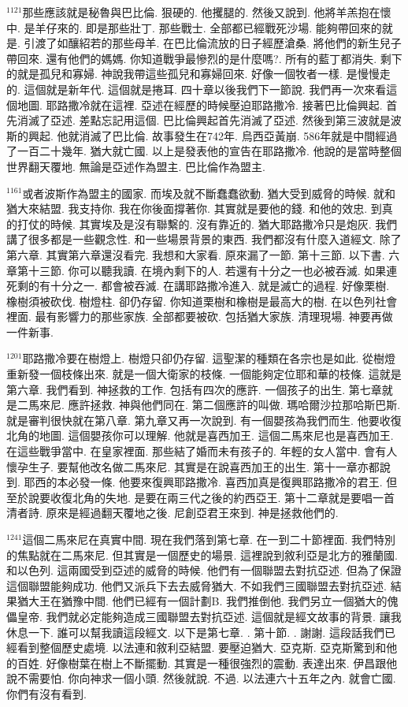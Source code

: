 \documentclass{book}
\begin{document}
$^{1121}$那些應該就是秘魯與巴比倫.
狠硬的.
他攫腿的.
然後又說到.
他將羊羔抱在懷中.
是羊仔來的.
即是那些壯丁.
那些戰士.
全部都已經戰死沙場.
能夠帶回來的就是.
引渡了如釀紹若的那些母羊.
在巴比倫流放的日子經歷滄桑.
將他們的新生兒子帶回來.
還有他們的媽媽.
你知道戰爭最慘烈的是什麼嗎?.
所有的藍丁都消失.
剩下的就是孤兒和寡婦.
神說我帶這些孤兒和寡婦回來.
好像一個牧者一樣.
是慢慢走的.
這個就是新年代.
這個就是捲耳.
四十章以後我們下一節說.
我們再一次來看這個地圖.
耶路撒冷就在這裡.
亞述在經歷的時候壓迫耶路撒冷.
接著巴比倫興起.
首先消滅了亞述.
差點忘記用這個.
巴比倫興起首先消滅了亞述.
然後到第三波就是波斯的興起.
他就消滅了巴比倫.
故事發生在742年.
烏西亞黃崩.
586年就是中間經過了一百二十幾年.
猶大就亡國.
以上是發表他的宣告在耶路撒冷.
他說的是當時整個世界翻天覆地.
無論是亞述作為盟主.
巴比倫作為盟主.

$^{1161}$或者波斯作為盟主的國家.
而埃及就不斷蠢蠢欲動.
猶大受到威脅的時候.
就和猶大來結盟.
我支持你.
我在你後面撐著你.
其實就是要他的錢.
和他的效忠.
到真的打仗的時候.
其實埃及是沒有聯繫的.
沒有靠近的.
猶大耶路撒冷只是炮灰.
我們講了很多都是一些觀念性.
和一些場景背景的東西.
我們都沒有什麼入道經文.
除了第六章.
其實第六章還沒看完.
我想和大家看.
原來漏了一節.
第十三節.
以下書.
六章第十三節.
你可以聽我讀.
在境內剩下的人.
若還有十分之一也必被吞滅.
如果連死剩的有十分之一.
都會被吞滅.
在講耶路撒冷進入.
就是滅亡的過程.
好像栗樹.
橡樹須被砍伐.
樹燈柱.
卻仍存留.
你知道栗樹和橡樹是最高大的樹.
在以色列社會裡面.
最有影響力的那些家族.
全部都要被砍.
包括猶大家族.
清理現場.
神要再做一件新事.

$^{1201}$耶路撒冷要在樹燈上.
樹燈只卻仍存留.
這聖潔的種類在各宗也是如此.
從樹燈重新發一個枝條出來.
就是一個大衛家的枝條.
一個能夠定位耶和華的枝條.
這就是第六章.
我們看到.
神拯救的工作.
包括有四次的應許.
一個孩子的出生.
第七章就是二馬來尼.
應許拯救.
神與他們同在.
第二個應許的叫做.
瑪哈爾沙拉那哈斯巴斯.
就是審判很快就在第八章.
第九章又再一次說到.
有一個嬰孩為我們而生.
他要收復北角的地圖.
這個嬰孩你可以理解.
他就是喜西加王.
這個二馬來尼也是喜西加王.
在這些戰爭當中.
在皇家裡面.
那些結了婚而未有孩子的.
年輕的女人當中.
會有人懷孕生子.
要幫他改名做二馬來尼.
其實是在說喜西加王的出生.
第十一章亦都說到.
耶西的本必發一條.
他要來復興耶路撒冷.
喜西加真是復興耶路撒冷的君王.
但至於說要收復北角的失地.
是要在兩三代之後的約西亞王.
第十二章就是要唱一首清者詩.
原來是經過翻天覆地之後.
尼創亞君王來到.
神是拯救他們的.

$^{1241}$這個二馬來尼在真實中間.
現在我們落到第七章.
在一到二十節裡面.
我們特別的焦點就在二馬來尼.
但其實是一個歷史的場景.
這裡說到敘利亞是北方的雅蘭國.
和以色列.
這兩國受到亞述的威脅的時候.
他們有一個聯盟去對抗亞述.
但為了保證這個聯盟能夠成功.
他們又派兵下去去威脅猶大.
不如我們三國聯盟去對抗亞述.
結果猶大王在猶豫中間.
他們已經有一個計劃B.
我們推倒他.
我們另立一個猶大的傀儡皇帝.
我們就必定能夠造成三國聯盟去對抗亞述.
這個就是經文故事的背景.
讓我休息一下.
誰可以幫我讀這段經文.
以下是第七章.
.
第十節.
.
謝謝.
這段話我們已經看到整個歷史處境.
以法連和敘利亞結盟.
要壓迫猶大.
亞克斯.
亞克斯驚到和他的百姓.
好像樹葉在樹上不斷擺動.
其實是一種很強烈的震動.
表達出來.
伊昌跟他說不需要怕.
你向神求一個小頭.
然後就說.
不過.
以法連六十五年之內.
就會亡國.
你們有沒有看到.
\end{document}
